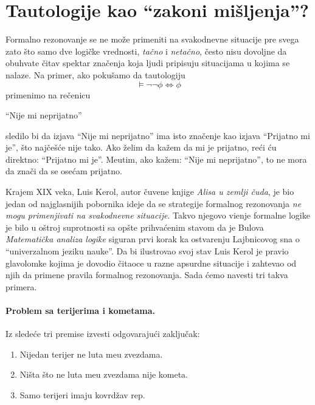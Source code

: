 \section{Tautologije kao \enquote{zakoni mi\v sljenja}?}

Formalno rezonovanje se ne mo\v ze primeniti na svakodnevne situacije pre svega zato \v sto
samo dve logi\v cke vrednosti, \emph{ta\v cno} i \emph{neta\v cno}, \v cesto nisu dovoljne da
obuhvate \v citav spektar zna\v cenja koja ljudi pripisuju situacijama u kojima se nalaze. Na primer,
ako poku\v samo da tautologiju
$$
  \vDash \lnot\lnot\phi \Leftrightarrow \phi
$$
primenimo na re\v cenicu
\begin{center}
  \enquote{Nije mi neprijatno}
\end{center}
sledilo bi da izjava \enquote{Nije mi neprijatno} ima isto zna\v cenje kao izjava \enquote{Prijatno mi je},
\v sto naj\v ce\v s\'ce nije tako. Ako \v zelim da ka\v zem da mi je prijatno, re\'ci \'cu direktno:
\enquote{Prijatno mi je}. Me\dj utim, ako ka\v zem: \enquote{Nije mi neprijatno}, to ne mora da zna\v ci da se ose\'cam prijatno.

Krajem XIX veka, Luis Kerol, autor \v cuvene knjige \textit{Alisa u zemlji \v cuda},
je bio jedan od najglasnijih pobornika ideje da se strategije formalnog rezonovanja
\emph{ne mogu primenjivati na svakodnevne situacije}. Takvo njegovo vi\dj enje formalne logike je bilo
u o\v stroj suprotnosti sa op\v ste prihva\'cenim stavom da je Bulova
\emph{Matemati\v cka analiza logike} siguran prvi korak ka ostvarenju Lajbnicovog sna o
\enquote{univerzalnom jeziku nauke}. Da bi ilustrovao svoj stav Luis Kerol
je pravio glavolomke kojima je dovodio \v citaoce u razne apsurdne situacije i zahtevao od njih da
primene pravila formalnog rezonovanja. Sada \'cemo navesti tri takva primera.

\paragraph{Problem sa terijerima i kometama.}
Iz slede\'ce tri premise izvesti odgovaraju\'ci zaklju\v cak:
\begin{enumerate}
\item
  Nijedan terijer ne luta me\dj u zvezdama.
\item
  Ni\v sta \v sto ne luta me\dj u zvezdama nije kometa.
\item
  Samo terijeri imaju kovrd\v zav rep.
\end{enumerate}

